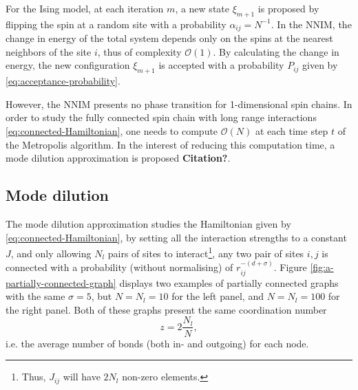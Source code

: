 For the Ising model, at each iteration $m$, a new state $\xi_{m+1}$ is proposed by flipping the spin at a random site with a probability $\alpha_{ij} = N^{-1}$.  In the NNIM, the change in energy of the total system depends only on the spins at the nearest neighbors of the site $i$, thus of complexity $\mathcal{O}(1)$. By calculating the change in energy, the new configuration $\xi_{m+1}$ is accepted with a probability $P_{ij}$ given by \eqref{eq:acceptance-probability}.

However, the NNIM presents no phase transition \cite{ising1925beitrag} for 1-dimensional spin chains. In order to study the fully connected spin chain with long range interactions \eqref{eq:connected-Hamiltonian}, one needs to compute $\mathcal{O}(N)$ at each time step $t$ of the Metropolis algorithm. In the interest of reducing this computation time, a mode dilution approximation is proposed \textbf{Citation?}.

\subsection{Mode dilution}%
\label{sub:Mode dilution}

The mode dilution approximation studies the Hamiltonian given by \eqref{eq:connected-Hamiltonian}, by setting all the interaction strengths to a constant $J$, and only allowing $N_l$ pairs of sites to interact\footnote{Thus, $J_{ij}$ will have $2N_l$ non-zero elements.}, any two pair of sites ${ i, j } $ is connected with a probability (without normalising) of $r_{ij}^{-(d+\sigma)}$. Figure \ref{fig:a-partially-connected-graph} displays two examples of partially connected graphs with the same $\sigma= 5$, but $N=N_l=10$ for the left panel, and  $N = N_l = 100$ for the  right panel. Both of these graphs present the same coordination number $$z = 2 \frac{N_l}{N},$$ i.e. the average number of bonds (both in- and outgoing) for each node.

